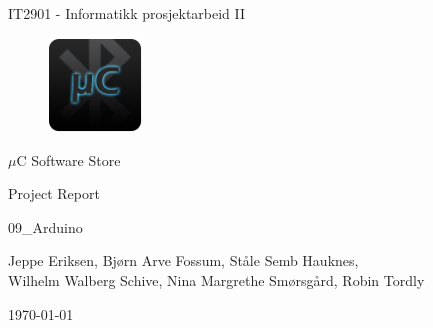 \begin{titlepage}
\begin{center}
\vspace*{1in}
{\LARGE IT2901 - Informatikk prosjektarbeid II}
\par
\vspace{1cm}


\begin{figure}[ht!]
\centering
\includegraphics[width=25mm]{images/ic_launcher.png}
\label{overflow}
\end{figure}


{\LARGE $\mu$C Software Store}
\par
\vspace{0.6in}
{\LARGE Project Report}
\par
\vspace{0.2in}
{\Large 09\_Arduino}
\par
\vfill
\par
\vspace{0.5in}
Jeppe Eriksen, Bjørn Arve Fossum, Ståle Semb Hauknes,\\ Wilhelm Walberg Schive, Nina Margrethe Smørsgård, Robin Tordly\\
\par
\vspace{0.4cm}
\today %
\end{center}
\end{titlepage}
